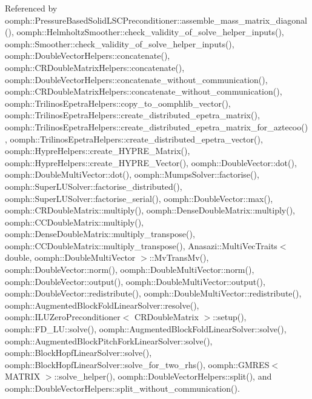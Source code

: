 Referenced by oomph\+::\+Pressure\+Based\+Solid\+L\+S\+C\+Preconditioner\+::assemble\+\_\+mass\+\_\+matrix\+\_\+diagonal(), oomph\+::\+Helmholtz\+Smoother\+::check\+\_\+validity\+\_\+of\+\_\+solve\+\_\+helper\+\_\+inputs(), oomph\+::\+Smoother\+::check\+\_\+validity\+\_\+of\+\_\+solve\+\_\+helper\+\_\+inputs(), oomph\+::\+Double\+Vector\+Helpers\+::concatenate(), oomph\+::\+C\+R\+Double\+Matrix\+Helpers\+::concatenate(), oomph\+::\+Double\+Vector\+Helpers\+::concatenate\+\_\+without\+\_\+communication(), oomph\+::\+C\+R\+Double\+Matrix\+Helpers\+::concatenate\+\_\+without\+\_\+communication(), oomph\+::\+Trilinos\+Epetra\+Helpers\+::copy\+\_\+to\+\_\+oomphlib\+\_\+vector(), oomph\+::\+Trilinos\+Epetra\+Helpers\+::create\+\_\+distributed\+\_\+epetra\+\_\+matrix(), oomph\+::\+Trilinos\+Epetra\+Helpers\+::create\+\_\+distributed\+\_\+epetra\+\_\+matrix\+\_\+for\+\_\+aztecoo(), oomph\+::\+Trilinos\+Epetra\+Helpers\+::create\+\_\+distributed\+\_\+epetra\+\_\+vector(), oomph\+::\+Hypre\+Helpers\+::create\+\_\+\+H\+Y\+P\+R\+E\+\_\+\+Matrix(), oomph\+::\+Hypre\+Helpers\+::create\+\_\+\+H\+Y\+P\+R\+E\+\_\+\+Vector(), oomph\+::\+Double\+Vector\+::dot(), oomph\+::\+Double\+Multi\+Vector\+::dot(), oomph\+::\+Mumps\+Solver\+::factorise(), oomph\+::\+Super\+L\+U\+Solver\+::factorise\+\_\+distributed(), oomph\+::\+Super\+L\+U\+Solver\+::factorise\+\_\+serial(), oomph\+::\+Double\+Vector\+::max(), oomph\+::\+C\+R\+Double\+Matrix\+::multiply(), oomph\+::\+Dense\+Double\+Matrix\+::multiply(), oomph\+::\+C\+C\+Double\+Matrix\+::multiply(), oomph\+::\+Dense\+Double\+Matrix\+::multiply\+\_\+transpose(), oomph\+::\+C\+C\+Double\+Matrix\+::multiply\+\_\+transpose(), Anasazi\+::\+Multi\+Vec\+Traits$<$ double, oomph\+::\+Double\+Multi\+Vector $>$\+::\+Mv\+Trans\+Mv(), oomph\+::\+Double\+Vector\+::norm(), oomph\+::\+Double\+Multi\+Vector\+::norm(), oomph\+::\+Double\+Vector\+::output(), oomph\+::\+Double\+Multi\+Vector\+::output(), oomph\+::\+Double\+Vector\+::redistribute(), oomph\+::\+Double\+Multi\+Vector\+::redistribute(), oomph\+::\+Augmented\+Block\+Fold\+Linear\+Solver\+::resolve(), oomph\+::\+I\+L\+U\+Zero\+Preconditioner$<$ C\+R\+Double\+Matrix $>$\+::setup(), oomph\+::\+F\+D\+\_\+\+L\+U\+::solve(), oomph\+::\+Augmented\+Block\+Fold\+Linear\+Solver\+::solve(), oomph\+::\+Augmented\+Block\+Pitch\+Fork\+Linear\+Solver\+::solve(), oomph\+::\+Block\+Hopf\+Linear\+Solver\+::solve(), oomph\+::\+Block\+Hopf\+Linear\+Solver\+::solve\+\_\+for\+\_\+two\+\_\+rhs(), oomph\+::\+G\+M\+R\+E\+S$<$ M\+A\+T\+R\+I\+X $>$\+::solve\+\_\+helper(), oomph\+::\+Double\+Vector\+Helpers\+::split(), and oomph\+::\+Double\+Vector\+Helpers\+::split\+\_\+without\+\_\+communication().

